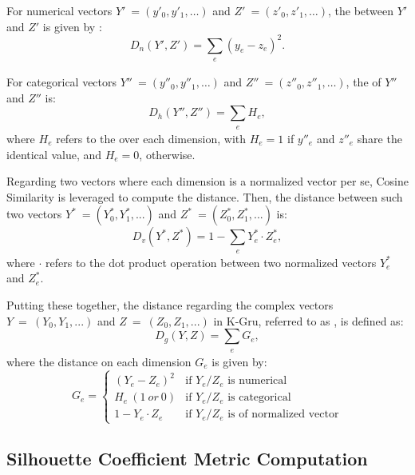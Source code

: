 For numerical vectors $Y'\ = (y'_0, y'_1, \ldots)$ and $Z'\ = (z'_0, z'_1, \ldots)$, the \od{} \cite{IEEEexample:books/mk/HanKP2011} between $Y'$ and $Z'$ is given by :
%
\begin{equation}
\label{eq:od}
D_n(Y', Z') = \sum_{\substack{e}} (y_e - z_e)^2.
\end{equation}

For categorical vectors $Y''\ = (y''_0, y''_1, \ldots)$ and  $Z''\ = (z''_0, z''_1, \ldots)$, the \hd{} \cite{IEEEexample:huang1997clustering} of $Y''$ and $Z''$ is:
%
\begin{equation}
\label{eq:hd}
D_h(Y'', Z'') = \sum_{\substack{e}} H_e,
\end{equation}
where $H_e$ refers to the \hd{} over each dimension, with $H_e = 1$ if $y''_e$ and $z''_e$ share the identical value, and $H_e = 0$, otherwise.

Regarding two vectors where each dimension is a normalized vector per se, Cosine Similarity is leveraged to compute the distance.
Then, the distance between such two vectors $Y^{\ast}\ = (Y^{\ast}_0, Y^{\ast}_1, ...)$ and $Z^{\ast}\ = (Z^{\ast}_0, Z^{\ast}_1, ...)$ is:
%
\begin{equation}
\label{eq:vd}
D_v(Y^{\ast}, Z^{\ast}) = 1- \sum_{\substack{e}} Y^{\ast}_e \cdot Z^{\ast}_e,
\end{equation}
where $\cdot$ refers to the dot product operation between two normalized vectors $Y^{\ast}_e$ and $Z^{\ast}_e$.

Putting these together, the distance regarding the complex vectors $Y\ =\ (Y_0, Y_1, ...)$ and $Z\ =\ (Z_0, Z_1, ...)$ in K-Gru, referred to as \gd{}, is defined as:
%
\begin{equation}
\label{eq:gd}
D_g(Y, Z) = \sum_{\substack{e}} G_e,
\end{equation}
where the distance on each dimension $G_e$ is given by:
%
\begin{equation}
\label{eq:ge}
G_e =
  \begin{cases}
    (Y_e - Z_e)^2       &  \text{if } Y_e/Z_e \text{ is numerical}\\
    H_e\ (1\ or\ 0)       	&  \text{if } Y_e/Z_e \text{ is categorical}\\
    1 - Y_e \cdot Z_e  		&  \text{if } Y_e/Z_e \text{ is of normalized vector}
  \end{cases}
\end{equation}


\subsection{Silhouette Coefficient Metric Computation}
\label{sec:compu}

